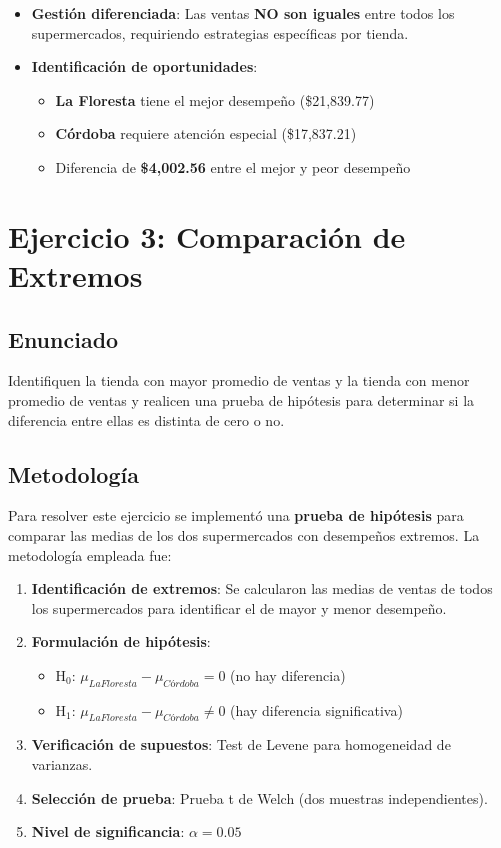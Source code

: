 \documentclass[11pt,a4paper]{article}
\begin{document}
\begin{itemize}
    \item \textbf{Gestión diferenciada}: Las ventas \textbf{NO son iguales} entre todos los supermercados, requiriendo estrategias específicas por tienda.
    \item \textbf{Identificación de oportunidades}: 
    \begin{itemize}
        \item \textbf{La Floresta} tiene el mejor desempeño (\$21,839.77)
        \item \textbf{Córdoba} requiere atención especial (\$17,837.21)
        \item Diferencia de \textbf{\$4,002.56} entre el mejor y peor desempeño
    \end{itemize}
\end{itemize}

\section{Ejercicio 3: Comparación de Extremos}

\subsection{Enunciado}
Identifiquen la tienda con mayor promedio de ventas y la tienda con menor promedio de ventas y realicen una prueba de hipótesis para determinar si la diferencia entre ellas es distinta de cero o no.

\subsection{Metodología}

Para resolver este ejercicio se implementó una \textbf{prueba de hipótesis} para comparar las medias de los dos supermercados con desempeños extremos. La metodología empleada fue:

\begin{enumerate}
    \item \textbf{Identificación de extremos}: Se calcularon las medias de ventas de todos los supermercados para identificar el de mayor y menor desempeño.
    \item \textbf{Formulación de hipótesis}:
    \begin{itemize}
        \item H$_0$: $\mu_{La Floresta} - \mu_{Córdoba} = 0$ (no hay diferencia)
        \item H$_1$: $\mu_{La Floresta} - \mu_{Córdoba} \neq 0$ (hay diferencia significativa)
    \end{itemize}
    \item \textbf{Verificación de supuestos}: Test de Levene para homogeneidad de varianzas.
    \item \textbf{Selección de prueba}: Prueba t de Welch (dos muestras independientes).
    \item \textbf{Nivel de significancia}: $\alpha = 0.05$
\end{enumerate}
\end{document}
